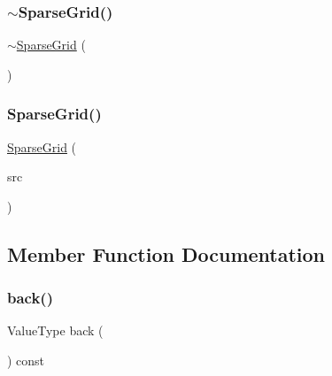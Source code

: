 \mbox{\label{classSparseGrid_a833c6d823380fd8995407d94bde29a5d}} 
\subsubsection{\texorpdfstring{$\sim$\+Sparse\+Grid()}{~SparseGrid()}}
{\footnotesize\ttfamily $\sim$\mbox{\hyperlink{classSparseGrid}{Sparse\+Grid}} (\begin{DoxyParamCaption}{ }\end{DoxyParamCaption})\hspace{0.3cm}{\ttfamily [virtual]}}

\mbox{\label{classSparseGrid_a6962f2939ac810b43b2e4b31fda92cc0}} 
\subsubsection{\texorpdfstring{Sparse\+Grid()}{SparseGrid()}\hspace{0.1cm}{\footnotesize\ttfamily [5/5]}}
{\footnotesize\ttfamily \mbox{\hyperlink{classSparseGrid}{Sparse\+Grid}} (\begin{DoxyParamCaption}\item[{const \mbox{\hyperlink{classSparseGrid}{Sparse\+Grid}}$<$ Value\+Type $>$ \&}]{src }\end{DoxyParamCaption})\hspace{0.3cm}{\ttfamily [inline]}}



\subsection{Member Function Documentation}
\mbox{\label{classSparseGrid_a38cbd80c93f450dc9bf3ca7c6a6220bd}} 
\subsubsection{\texorpdfstring{back()}{back()}}
{\footnotesize\ttfamily Value\+Type back (\begin{DoxyParamCaption}{ }\end{DoxyParamCaption}) const}

